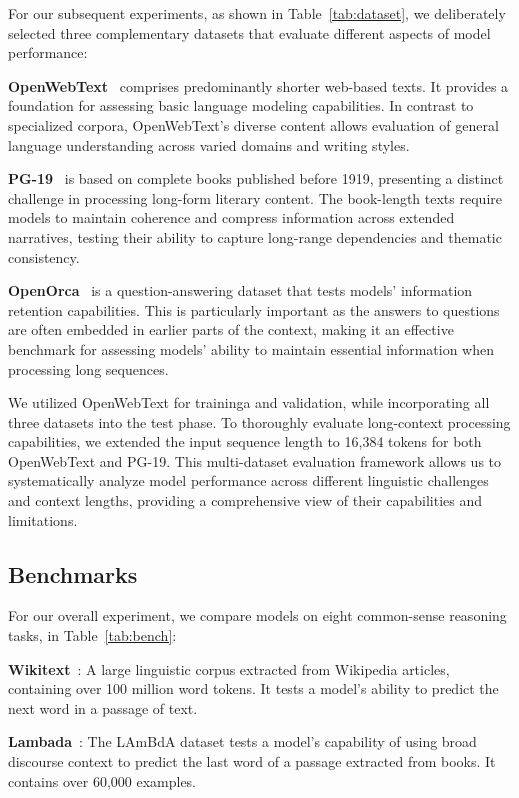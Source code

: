 For our subsequent experiments, as shown in Table~\ref{tab:dataset}, we deliberately selected three complementary datasets that evaluate different aspects of model performance:

\textbf{OpenWebText}~\cite{openwebtext} comprises predominantly shorter web-based texts. It provides a foundation for assessing basic language modeling capabilities. In contrast to specialized corpora, OpenWebText's diverse content allows evaluation of general language understanding across varied domains and writing styles.

\textbf{PG-19}~\cite{pg19} is based on complete books published before 1919, presenting a distinct challenge in processing long-form literary content. The book-length texts require models to maintain coherence and compress information across extended narratives, testing their ability to capture long-range dependencies and thematic consistency. 

\textbf{OpenOrca}~\cite{OpenOrca} is a question-answering dataset that tests models' information retention capabilities. This is particularly important as the answers to questions are often embedded in earlier parts of the context, making it an effective benchmark for assessing models' ability to maintain essential information when processing long sequences.

We utilized OpenWebText for traininga and validation, while incorporating all three datasets into the test phase.
To thoroughly evaluate long-context processing capabilities, we extended the input sequence length to 16,384 tokens for both OpenWebText and PG-19. This multi-dataset evaluation framework allows us to systematically analyze model performance across different linguistic challenges and context lengths, providing a comprehensive view of their capabilities and limitations.


\subsection{Benchmarks}
\label{app:benchmarks}

For our overall experiment, we compare models on eight common-sense reasoning tasks, in Table~\ref{tab:bench}:

\textbf{Wikitext}~\cite{wikitext}: A large linguistic corpus extracted from Wikipedia articles, containing over 100 million word tokens. It tests a model's ability to predict the next word in a passage of text.

\textbf{Lambada}~\cite{lambada}: The LAmBdA dataset tests a model's capability of using broad discourse context to predict the last word of a passage extracted from books. It contains over 60,000 examples.

